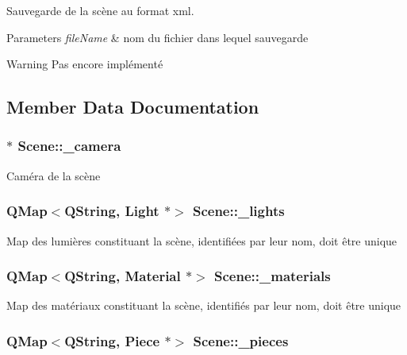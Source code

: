Sauvegarde de la scène au format xml. 


\begin{DoxyParams}{Parameters}
{\em file\+Name} & nom du fichier dans lequel sauvegarde \\
\hline
\end{DoxyParams}
\begin{DoxyWarning}{Warning}
Pas encore implémenté 
\end{DoxyWarning}


\subsection{Member Data Documentation}
\hypertarget{class_scene_a8cce9e0f96edc8655a9b9a885e2c26bf}{
\subsubsection[{\+\_\+camera}]{$\ast$ Scene\+::\+\_\+camera}}\label{class_scene_a8cce9e0f96edc8655a9b9a885e2c26bf}
Caméra de la scène \hypertarget{class_scene_a0ef33120973d6afc1754d2154d7c338a}{
\subsubsection[{\+\_\+lights}]{\setlength{\rightskip}{0pt plus 5cm}Q\+Map$<$Q\+String, {\bf Light} $\ast$$>$ Scene\+::\+\_\+lights\hspace{0.3cm}{\ttfamily [private]}}}\label{class_scene_a0ef33120973d6afc1754d2154d7c338a}
Map des lumières constituant la scène, identifiées par leur nom, doit être unique \hypertarget{class_scene_a5b96810fdeb47632d5ce6c2c47f41691}{
\subsubsection[{\+\_\+materials}]{\setlength{\rightskip}{0pt plus 5cm}Q\+Map$<$Q\+String, {\bf Material} $\ast$$>$ Scene\+::\+\_\+materials\hspace{0.3cm}{\ttfamily [private]}}}\label{class_scene_a5b96810fdeb47632d5ce6c2c47f41691}
Map des matériaux constituant la scène, identifiés par leur nom, doit être unique \hypertarget{class_scene_aa3a488d4be41fe6a187488e1e7a1035c}{
\subsubsection[{\+\_\+pieces}]{\setlength{\rightskip}{0pt plus 5cm}Q\+Map$<$Q\+String, {\bf Piece} $\ast$$>$ Scene\+::\+\_\+pieces\hspace{0.3cm}{\ttfamily [private]}}}\label{class_scene_aa3a488d4be41fe6a187488e1e7a1035c}
